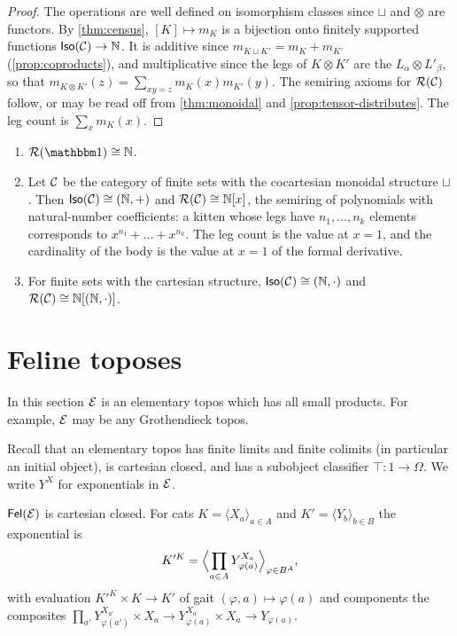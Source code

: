 \begin{proof}
The operations are well defined on isomorphism classes since $\sqcup$ and
$\otimes$ are functors. By \cref{thm:census}, $[K]\mapsto m_K$ is a bijection
onto finitely supported functions $\mathsf{Iso}(\mathcal{C})\to\mathbb N$. It is additive since
$m_{K\sqcup K'}=m_K+m_{K'}$ (\cref{prop:coproducts}), and multiplicative since
the legs of $K\otimes K'$ are the $L_\alpha\otimes L'_\beta$, so that
$m_{K\otimes K'}(z)=\sum_{xy=z}m_K(x)m_{K'}(y)$. The semiring axioms for
$\mathcal R(\mathcal{C})$ follow, or may be read off from \cref{thm:monoidal} and
\cref{prop:tensor-distributes}. The leg count is $\sum_xm_K(x)$.
\end{proof}

\begin{example}\label{ex:kitten-rig}
\begin{enumerate}
\item $\mathcal R(\one)\iso\mathbb N$.
\item Let $\mathcal{C}$ be the category of finite sets with the cocartesian monoidal
  structure $\sqcup$. Then $\mathsf{Iso}(\mathcal{C})\cong(\mathbb N,+)$ and
  $\mathcal R(\mathcal{C})\cong\mathbb N[x]$, the semiring of polynomials with
  natural-number coefficients: a kitten whose legs have $n_1,\dots,n_k$
  elements corresponds to $x^{n_1}+\dots+x^{n_k}$. The leg count is the value
  at $x=1$, and the cardinality of the body is the value at $x=1$ of the
  formal derivative.
\item For finite sets with the cartesian structure, $\mathsf{Iso}(\mathcal{C})\cong(\mathbb N,\cdot)$
  and $\mathcal R(\mathcal{C})\cong\mathbb N[(\mathbb N,\cdot)]$.
\end{enumerate}
\end{example}

\section{Feline toposes}\label{sec:topos}

\begin{assumption}\label{ass:topos}
In this section $\mathcal{E}$ is an elementary topos which has all small products. For
example, $\mathcal{E}$ may be any Grothendieck topos.
\end{assumption}

Recall that an elementary topos has finite limits and finite colimits (in
particular an initial object), is cartesian closed, and has a subobject
classifier $\top\colon1\to\Omega$. We write $Y^X$ for exponentials in $\mathcal{E}$.

\begin{proposition}\label{prop:exponential}
$\mathsf{Fel}(\mathcal{E})$ is cartesian closed. For cats $K=\langle X_a\rangle_{a\in A}$ and
$K'=\langle Y_b\rangle_{b\in B}$ the exponential is
\[
K'^{K}=\Bigl\langle\prod_{a\in A}Y_{\varphi(a)}^{X_a}\Bigr\rangle_{\varphi\in B^A},
\]
with evaluation $K'^K\times K\to K'$ of gait $(\varphi,a)\mapsto\varphi(a)$ and
components the composites
$\prod_{a'}Y_{\varphi(a')}^{X_{a'}}\times X_a\to Y_{\varphi(a)}^{X_a}\times X_a\to Y_{\varphi(a)}$.
\end{proposition}

